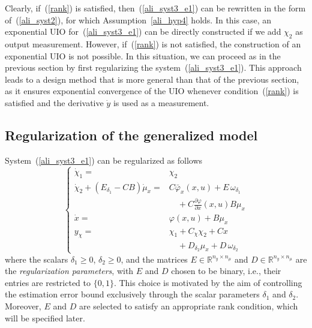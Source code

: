 \documentclass{ifacconf}
\def\eqref#1{(\ref{#1})}
\begin{document}
{Clearly, if~\eqref{rank} is satisfied, then~\eqref{ali_syst3_e1} can be rewritten in the form of~\eqref{ali_syst2}, for which Assumption~\ref{ali_hyp4} holds. In this case, an exponential UIO for~\eqref{ali_syst3_e1} can be directly constructed if we add $\chi_{2}$ as output measurement. However, if~\eqref{rank} is not satisfied, the construction of an exponential UIO is not possible. In this situation, we can proceed as in the previous section by first regularizing the system~\eqref{ali_syst3_e1}. This approach leads to a design method that is more general than that of the previous section, as it ensures exponential convergence of the UIO whenever condition~\eqref{rank} is satisfied and the derivative $\dot{y}$ is used as a measurement.



\subsection{Regularization of the generalized model}
System~\eqref{ali_syst3_e1} can be regularized as follows
\begin{equation}\label{ali_syst3_e2}
\left\{
\begin{array}{rcl}
\dot{\chi}_{1}  = & \chi_{2} 
\\
\dot{\chi}_{2} + \left( E_{\delta_{1}} - C B \right) \dot{\mu}_{x}   = & C  \bar{\varphi}_{x}(x,u)  + E\, \omega_{\delta_{1}}  \\
&\quad+\displaystyle C \frac{\partial \varphi}{\partial x}(x,u) B \mu_{x}
\\ 
\dot{x}  = &  \varphi(x,u) + B \mu_{x} \\
y_{\chi}  = &  \chi_{1} + C_{\chi} \chi_{2} + C x \\%
&\quad +D_{\delta_2} \mu_{x} + D\, \omega_{\delta_{2}} 
\end{array}
\right.
\end{equation}
where the scalars $\delta_1 \geq 0$, $\delta_2 \geq 0$, and the matrices $E\in\mathbb{R}^{n_{y}\times n_{\mu}}$ and $D\in\mathbb{R}^{n_{y}\times n_{\mu}}$ are the {\it regularization parameters}, with $E$ and $D$ chosen to be binary, i.e., their entries are restricted to $\{0,1\}$. This choice is motivated by the aim of controlling the estimation error bound exclusively through the scalar parameters $\delta_1$ and $\delta_2$. Moreover, $E$ and $D$ are selected to satisfy an appropriate rank condition, which will be specified later.


}
\end{document}
